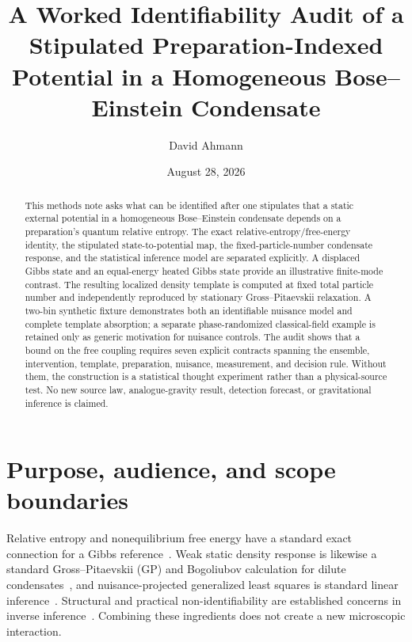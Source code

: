 \documentclass[aps,prd,twocolumn,superscriptaddress,nofootinbib,floatfix]{revtex4-2}
\begin{document}
\title{A Worked Identifiability Audit of a Stipulated Preparation-Indexed Potential in a Homogeneous Bose--Einstein Condensate}

\author{David Ahmann}

\date{August 28, 2026}

\begin{abstract}
This methods note asks what can be identified after one stipulates that a static external potential in a homogeneous Bose--Einstein condensate depends on a preparation's quantum relative entropy. The exact relative-entropy/free-energy identity, the stipulated state-to-potential map, the fixed-particle-number condensate response, and the statistical inference model are separated explicitly. A displaced Gibbs state and an equal-energy heated Gibbs state provide an illustrative finite-mode contrast. The resulting localized density template is computed at fixed total particle number and independently reproduced by stationary Gross--Pitaevskii relaxation. A two-bin synthetic fixture demonstrates both an identifiable nuisance model and complete template absorption; a separate phase-randomized classical-field example is retained only as generic motivation for nuisance controls. The audit shows that a bound on the free coupling requires seven explicit contracts spanning the ensemble, intervention, template, preparation, nuisance, measurement, and decision rule. Without them, the construction is a statistical thought experiment rather than a physical-source test. No new source law, analogue-gravity result, detection forecast, or gravitational inference is claimed.
\end{abstract}

\maketitle

\section{Purpose, audience, and scope boundaries}
\label{sec:introduction}

Relative entropy and nonequilibrium free energy have a standard exact connection for a Gibbs reference~\cite{Wilming2017}. Weak static density response is likewise a standard Gross--Pitaevskii (GP) and Bogoliubov calculation for dilute condensates~\cite{Bloch2008,Bisset2019}, and nuisance-projected generalized least squares is standard linear inference~\cite{Rao1973}. Structural and practical non-identifiability are established concerns in inverse inference~\cite{Raue2009}. Combining these ingredients does not create a new microscopic interaction.
\end{document}
